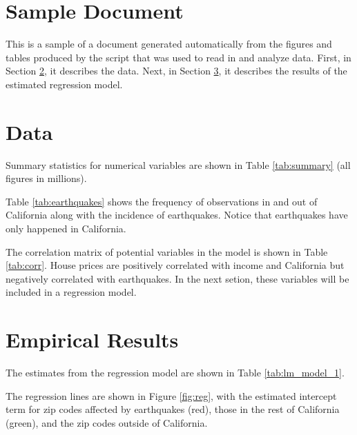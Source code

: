 \documentclass{paper}
\begin{document}

\section{Sample Document}

This is a sample of a document generated automatically from the figures and tables produced by
the script that was used to read in and analyze data.
First, in Section \ref{sec:data}, it describes the data.
Next, in Section \ref{sec:results}, it describes the results of the estimated regression model.

\section{Data} \label{sec:data}

Summary statistics for numerical variables are shown in Table \ref{tab:summary} (all figures in millions).




Table \ref{tab:earthquakes} shows the frequency of observations in and out of California along with the incidence of earthquakes. Notice that earthquakes have only happened in California.



The correlation matrix of potential variables in the model is shown in Table \ref{tab:corr}.
House prices are positively correlated with income and California but negatively correlated with earthquakes. In the next setion, these variables will be included in a regression model.





\pagebreak
\section{Empirical Results}  \label{sec:results}


The estimates from the regression model are shown in Table \ref{tab:lm_model_1}.







\pagebreak
The regression lines are shown in Figure \ref{fig:reg}, with the estimated intercept term for zip codes affected by earthquakes (red), those in the rest of California (green), and the zip codes outside of California.
\end{document}
